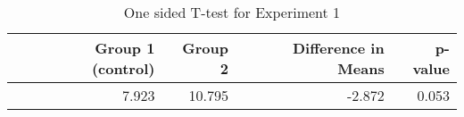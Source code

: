 \begin{table}[ht]
\centering
\begin{tabular}{rrrrr}
  \hline
 & Group 1 (control) & Group 2 & Difference in Means & p-value \\ 
  \hline
 & 7.923 & 10.795 & -2.872 & 0.053 \\ 
   \hline
\end{tabular}
\caption{One sided T-test for Experiment 1} 
\label{tab:ttest}
\end{table}
